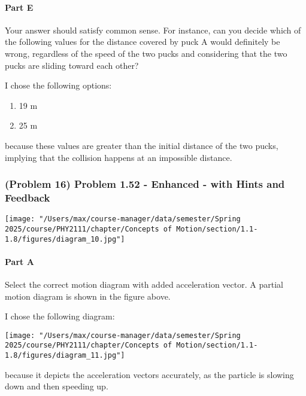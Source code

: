 \paragraph{Part E}

Your answer should satisfy common sense. For instance, can you decide which of the following values for the distance covered by puck A would definitely be wrong, regardless of the speed of the two pucks and considering that the two pucks are sliding toward each other?

\vspace{1em}

\begin{solution}
	I chose the following options:
	\begin{enumerate}
		\item 19 m
		\item 25 m
	\end{enumerate}
	because these values are greater than the initial distance of the two pucks, implying that the collision happens at an impossible distance.
\end{solution}

\newpage

\subsubsection{(Problem 16) Problem 1.52 - Enhanced - with Hints and Feedback}

\begin{center}
	\texttt{[image: "/Users/max/course-manager/data/semester/Spring 2025/course/PHY2111/chapter/Concepts of Motion/section/1.1-1.8/figures/diagram\_10.jpg"]}
\end{center}

\paragraph{Part A}

Select the correct motion diagram with added acceleration vector. A partial motion diagram is shown in the figure above.

\vspace{1em}

\begin{solution}
	I chose the following diagram:
	\begin{center}
		\texttt{[image: "/Users/max/course-manager/data/semester/Spring 2025/course/PHY2111/chapter/Concepts of Motion/section/1.1-1.8/figures/diagram\_11.jpg"]}
	\end{center}
	because it depicts the acceleration vectors accurately, as the particle is slowing down and then speeding up.
\end{solution}

